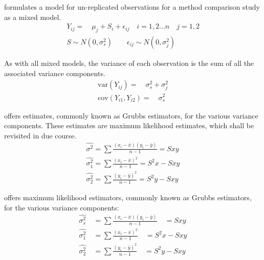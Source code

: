 \documentclass[12pt, a4paper]{report}
\theoremstyle{plain}
\theoremstyle{definition}
\theoremstyle{remark}
\begin{document}
	
	
	
	\citet{kinsella} formulates a model for un-replicated observations
	for a method comparison study as a mixed model.
	\begin{eqnarray}
	Y_{ij} =\quad \mu_{j} + S_{i} + \epsilon_{ij} \quad i=1,2...n\quad
	j=1,2\\
	S \sim N(0,\sigma^{2}_{s})\qquad \epsilon_{ij} \sim
	N(0,\sigma^{2}_{j}) \nonumber
	\end{eqnarray}
	
	As with all mixed models, the variance of each observation is the
	sum of all the associated variance components.
	\begin{eqnarray}
	\textrm{var}(Y_{ij}) =\quad \sigma^{2}_{s} + \sigma^{2}_{j} \\
	\textrm{cov}(Y_{i1},Y_{i2})=\quad \sigma^{2}_{s} \nonumber
	\end{eqnarray}
	
	\citet{Grubbs48} offers estimates, commonly known as Grubbs estimators, for the various variance components. These estimates are maximum likelihood estimates, which shall be revisited in due course.
	\begin{eqnarray*}
		\hat{\sigma^{2}} = \sum{\frac{(x_{i}-\bar{x})(y_{i}-\bar{y})}{n-1}} = Sxy\\
		\hat{\sigma^{2}_{1}} = \sum{\frac{(x_{i}-\bar{x})^{2}}{n-1}} =S^{2}x - Sxy  \\
		\hat{\sigma^{2}_{2}} =
		\sum{\frac{(y_{i}-\bar{y})^{2}}{n-1}} = S^{2}y - Sxy
	\end{eqnarray*}
	
	\citet{Grubbs48} offers maximum likelihood estimators, commonly
	known as Grubbs estimators, for the various variance components:
	\begin{eqnarray}
	\hat{\sigma^{2}_{s}} \quad= \sum{\frac{(x_{i}-\bar{x})(y_{i}-\bar{y})}{n-1}}\quad=Sxy\\
	\hat{\sigma^{2}_{1}} \quad= \sum{\frac{(x_{i}-\bar{x})^{2}}{n-1}} \quad=S^{2}x-Sxy \nonumber\\
	\hat{\sigma^{2}_{2}} \quad=
	\sum{\frac{(y_{i}-\bar{y})^{2}}{n-1}}\quad=S^{2}y-Sxy \nonumber
	\nonumber
	\end{eqnarray}
	
\end{document}
